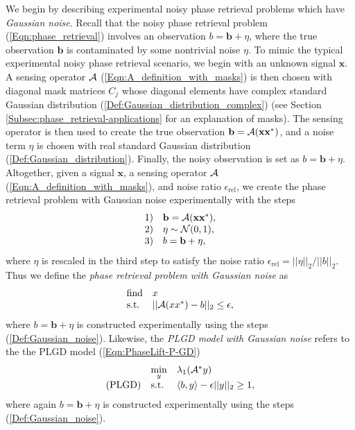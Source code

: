 We begin by describing experimental noisy phase retrieval problems which have \textit{Gaussian noise}.  Recall that the noisy phase retrieval problem (\ref{Eqn:phase_retrieval}) involves an observation $b = \mathbf{b} + \eta$, where the true observation $\mathbf{b}$ is contaminated by some nontrivial noise $\eta$.  To mimic the typical experimental noisy phase retrieval scenario, we begin with an unknown signal $\mathbf{x}$.  A sensing operator ${\mathcal A}$ (\ref{Eqn:A_definition_with_masks}) is then chosen with diagonal mask matrices $C_j$ whose diagonal elements have complex standard Gaussian distribution (\ref{Def:Gaussian_distribution_complex}) (see Section \ref{Subsec:phase_retrieval-applications} for an explanation of masks).  The sensing operator is then used to create the true observation $\mathbf{b} = {\mathcal A}(\mathbf{x}\mathbf{x}^*)$, and a noise term $\eta$ is chosen with real standard Gaussian distribution (\ref{Def:Gaussian_distribution}).  Finally, the noisy observation is set as $b = \mathbf{b} + \eta$.  Altogether, given a signal $\mathbf{x}$, a sensing operator ${\mathcal A}$ (\ref{Eqn:A_definition_with_masks}), and noise ratio $\epsilon_\text{rel}$, we create the phase retrieval problem with Gaussian noise experimentally with the steps
\begin{equation} 			\label{Def:Gaussian_noise}
\begin{array}{ll}
1)	&	\mathbf{b} = {\mathcal A}(\mathbf{x}\mathbf{x}^*) ,\\
2) &	\eta \sim {\mathcal N}(0,1), \\
3) & b = \mathbf{b} + \eta,
\end{array}
\end{equation}
where $\eta$ is rescaled in the third step to satisfy the noise ratio $\epsilon_\text{rel} = ||\eta||_2 / ||b||_2$.  Thus we define the \textit{phase retrieval problem with Gaussian noise} as
\begin{equation} \label{Eqn:phase_retrieval_Gaussian_noise}
\begin{array}{ll}
		\text{find}
		&	x
			\\
		\textnormal{s.t.}
		& 	||{\mathcal A} (xx^*) - b||_2 \leq \epsilon,
\end{array}
\end{equation}
where $b = \mathbf{b} + \eta$ is constructed experimentally using the steps (\ref{Def:Gaussian_noise}).  Likewise, the \textit{PLGD model with Gaussian noise} refers to the the PLGD model (\ref{Eqn:PhaseLift-P-GD}) 
\begin{equation} 			\label{Eqn:PhaseLift-GD_Gaussian_noise}
\begin{array}{lll}
	&\min\limits_{\substack{y}}
					&	\lambda_1({\mathcal A}^* y)
						\\
	\textnormal{(PLGD)}
				&	\textnormal{s.t.}
					&	\langle b, y \rangle - \epsilon ||y||_2 \geq 1,
\end{array}
\end{equation}
where again $b = \mathbf{b} + \eta$ is constructed experimentally using the steps (\ref{Def:Gaussian_noise}).  




